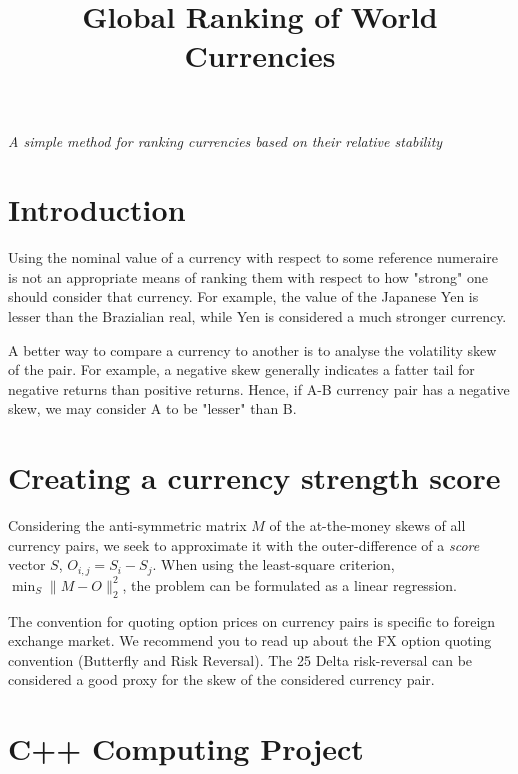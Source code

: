\documentclass[a4paper]{article}
\author
{
}
\title{Global Ranking of World Currencies}
\date{}
\newcommand{\1}{\textbf{1}}
\begin{document}
\maketitle
\vspace{-1cm}

\begin{center}{\Large \emph{A simple method for ranking currencies based on their relative stability} }\end{center}

\section{Introduction}

\par Using the nominal value of a currency with respect to some reference numeraire is not an appropriate means of ranking them with respect to how "strong" one should consider that currency. For example, the value of the Japanese Yen is lesser than the Brazialian real, while Yen is considered a much stronger currency.

\par A better way to compare a currency to another is to analyse the volatility skew of the pair. For example, a negative skew generally indicates a fatter tail for negative returns than positive returns. Hence, if A-B currency pair has a negative skew, we may consider A to be "lesser" than B.

\section{Creating a currency strength score}

\par Considering the anti-symmetric matrix $M$ of the at-the-money skews of all currency pairs, we seek to approximate it with the outer-difference of a \emph{score} vector $S$, $O_{i, j} = S_i - S_j$. When using the least-square criterion, $\min_{S} \|M - O\|_2^2$, the problem can be formulated as a linear regression.

\par The convention for quoting option prices on currency pairs is specific to foreign exchange market. We recommend you to read up about the FX option quoting convention (Butterfly and Risk Reversal). The 25 Delta risk-reversal can be considered a good proxy for the skew of the considered currency pair.

\section{C++ Computing Project}
\end{document}
